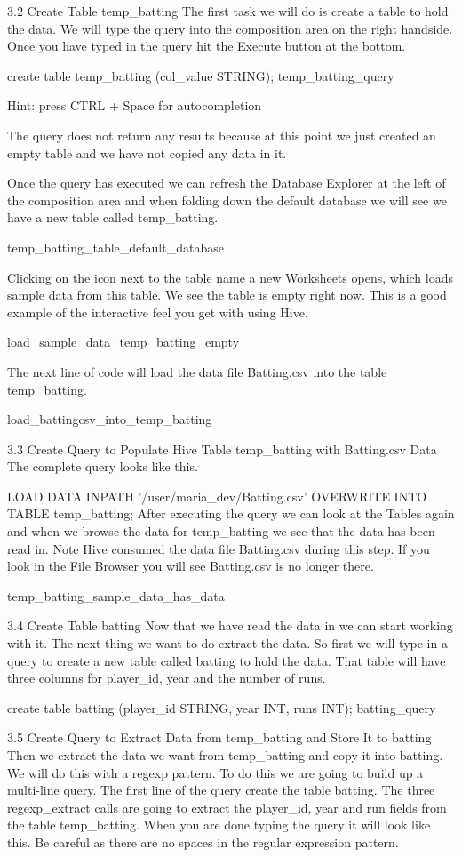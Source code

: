 3.2 Create Table temp_batting
The first task we will do is create a table to hold the data. We will type the query into the composition area on the right handside. Once you have typed in the query hit the Execute button at the bottom.

create table temp_batting (col_value STRING);
temp_batting_query

Hint: press CTRL + Space for autocompletion

The query does not return any results because at this point we just created an empty table and we have not copied any data in it.

Once the query has executed we can refresh the Database Explorer at the left of the composition area and when folding down the default database we will see we have a new table called temp_batting.

temp_batting_table_default_database

Clicking on the icon next to the table name a new Worksheets opens, which loads sample data from this table. We see the table is empty right now. This is a good example of the interactive feel you get with using Hive.

load_sample_data_temp_batting_empty

The next line of code will load the data file Batting.csv into the table temp_batting.

load_battingcsv_into_temp_batting

3.3 Create Query to Populate Hive Table temp_batting with Batting.csv Data
The complete query looks like this.

LOAD DATA INPATH '/user/maria_dev/Batting.csv' OVERWRITE INTO TABLE temp_batting;
After executing the query we can look at the Tables again and when we browse the data for temp_batting we see that the data has been read in. Note Hive consumed the data file Batting.csv during this step. If you look in the File Browser you will see Batting.csv is no longer there.

temp_batting_sample_data_has_data

3.4 Create Table batting
Now that we have read the data in we can start working with it. The next thing we want to do extract the data. So first we will type in a query to create a new table called batting to hold the data. That table will have three columns for player_id, year and the number of runs.

create table batting (player_id STRING, year INT, runs INT);
batting_query

3.5 Create Query to Extract Data from temp_batting and Store It to batting
Then we extract the data we want from temp_batting and copy it into batting. We will do this with a regexp pattern. To do this we are going to build up a multi-line query. The first line of the query create the table batting. The three regexp_extract calls are going to extract the player_id, year and run fields from the table temp_batting. When you are done typing the query it will look like this. Be careful as there are no spaces in the regular expression pattern.

